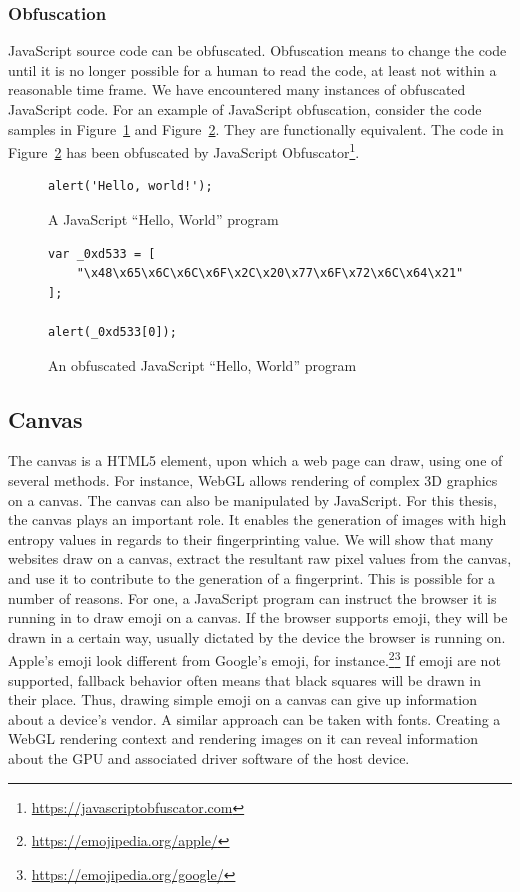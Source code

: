 \documentclass[
    fontsize=12pt,
    headings=small,
    parskip=half,
    bibliography=totoc,
    numbers=noenddot,
    open=any
    ]{scrreprt}
\begin{document}
\subsubsection{Obfuscation}
\label{fundamentals:obfuscation}
JavaScript source code can be obfuscated. Obfuscation means to change the code
until it is no longer possible for a human to read the code, at least not within
a reasonable time frame. We have encountered many instances of obfuscated JavaScript
code. For an example of JavaScript obfuscation, consider the code samples in
Figure~\ref{code:javascript_hello_world} and Figure~\ref{code:javascript_obfuscated}.
They are functionally equivalent. The code in Figure~\ref{code:javascript_obfuscated}
has been obfuscated by JavaScript Obfuscator\footnote{\url{https://javascriptobfuscator.com}}.

\begin{figure}
\centering
\begin{verbatim}
alert('Hello, world!');
\end{verbatim}
\caption{A JavaScript ``Hello, World'' program}
\label{code:javascript_hello_world}
\end{figure}

\begin{figure}
\centering
\begin{verbatim}
var _0xd533 = [
    "\x48\x65\x6C\x6C\x6F\x2C\x20\x77\x6F\x72\x6C\x64\x21"
];

alert(_0xd533[0]);
\end{verbatim}
\caption{An obfuscated JavaScript ``Hello, World'' program}
\label{code:javascript_obfuscated}
\end{figure}

\subsection{Canvas}
\label{fundamentals:canvas}
The canvas \cite{w3ccanvas} is a HTML5 element, upon which a web page can draw,
using one of several methods. For instance, WebGL allows rendering of complex
3D graphics on a canvas.
The canvas can also be manipulated by JavaScript. For this thesis,
the canvas plays an important role. It enables the generation
of images with high entropy values in regards to their fingerprinting value.
We will show that many websites draw on a canvas, extract the resultant raw pixel
values from the canvas, and use it to contribute to the generation of a fingerprint.
This is possible for a number of reasons. For one, a JavaScript program
can instruct the browser it is running in to draw emoji on a canvas.
If the browser supports emoji, they will be drawn in a certain way, usually dictated
by the device the browser is running on. Apple's emoji look different from Google's
emoji, for instance.\footnote{\url{https://emojipedia.org/apple/}}\footnote{\url{https://emojipedia.org/google/}}
If emoji are not supported, fallback behavior often means that black squares will
be drawn in their place.
Thus, drawing simple emoji on a canvas can give up information about a device's vendor.
A similar approach can be taken with fonts.
Creating a WebGL rendering context and rendering images on it can reveal
information about the GPU and associated driver software of the host device.
\end{document}
